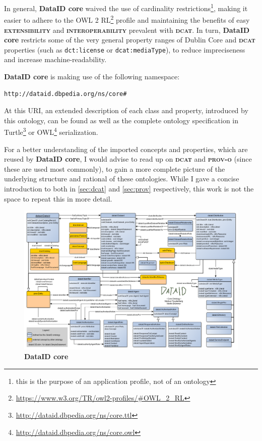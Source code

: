 \documentclass[a4paper,english,twoside,BCOR1.5cm,headsepline,DIV12,appendixprefix,final,12pt]{scrbook}
\newcommand{\extensibility}{{\ttfamily\scshape\bfseries extensibility}\xspace}
\newcommand{\interoperability}{{\ttfamily\scshape\bfseries interoperability}\xspace}
\newcommand{\core}{{\ttfamily\bfseries DataID core}\xspace}
\newcommand{\prov}{{\scshape\bfseries prov-o}\xspace}
\newcommand{\dcat}{{\scshape\bfseries dcat}\xspace}
\newcommand{\prop}[1]{{{\texttt{#1}}}}
\newcommand\footnoteurl[1]{\footnote{\scriptsize\url{#1}}}
\begin{document}
In general, \core waived the use of cardinality restrictions\footnote{this is the purpose of an application profile, not of an ontology}, making it easier to adhere to the OWL 2 RL\footnoteurl{https://www.w3.org/TR/owl2-profiles/#OWL_2_RL} profile and maintaining the benefits of easy \extensibility and \interoperability prevalent with \dcat. In turn, \core restricts some of the very general property ranges of Dublin Core and \dcat properties (such as \prop{dct:license} or \prop{dcat:mediaType}), to reduce impreciseness and increase machine-readability.

\core is making use of the following namespace:
\begin{lstlisting}[language=ttl, label=lst:graph,linewidth=\columnwidth,breaklines=true,basicstyle=\ttfamily\footnotesize]
http://dataid.dbpedia.org/ns/core#
\end{lstlisting}
At this URI, an extended description of each class and property, introduced by this ontology, can be found as well as the complete ontology specification in Turtle\footnoteurl{http://dataid.dbpedia.org/ns/core.ttl} or OWL\footnoteurl{http://dataid.dbpedia.org/ns/core.owl} serialization.

For a better understanding of the imported concepts and properties, which are reused by \core, I would advise to read up on \dcat \cite{ddcat} and \prov \cite{prov} (since these are used most commonly), to gain a more complete picture of the underlying structure and rational of these ontologies. While I gave a concise introduction to both in \cref{sec:dcat} and \cref{sec:prov} respectively, this work is not the space to repeat this in more detail.

\begin{figure}
\centering
	\vspace*{-0.8cm}
  \includegraphics[angle=90, width=\textwidth]{images/DataIdOntology.png}
  \caption{\core}
  \label{fig:core}
\end{figure} 
\end{document}
